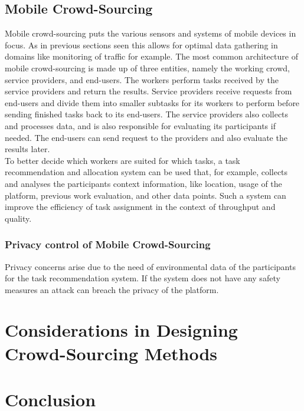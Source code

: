 \documentclass[a4paper,12pt]{report}
\begin{document}
	\section[Mobile Crowd-Sourcing]{Mobile Crowd-Sourcing \cite{MobileCrowdSourcing}}
	\startsection
		Mobile crowd-sourcing puts the various sensors and systems of mobile devices in focus. As in previous sections seen this allows for optimal data gathering in domains like monitoring of traffic for example.
		The most common architecture of mobile crowd-sourcing is made up of three entities, namely the working crowd, service providers, and end-users. The workers perform tasks received by the service providers and return the results. Service providers receive requests from end-users and divide them into smaller subtasks for its workers to perform before sending finished tasks back to its end-users. The service providers also collects and processes data, and is also responsible for evaluating its participants if needed. The end-users can send request to the providers and also evaluate the results later.\\
		To better decide which workers are suited for which tasks, a task recommendation and allocation system can be used that, for example, collects and analyses the participants context information, like location, usage of the platform, previous work evaluation, and other data points. Such a system can improve the efficiency of task assignment in the context of throughput and quality.
		\subsection{Privacy control of Mobile Crowd-Sourcing}
		\startsubsection
			Privacy concerns arise due to the need of environmental data of the participants for the task recommendation system. If the system does not have any safety measures an attack can breach the privacy  of the platform.
			\closesection  
	\closesection


	\chapter{Considerations in Designing Crowd-Sourcing Methods}
	\startsection
	\closesection
	
	\chapter{Conclusion}
	\startsection
	\closesection
	
	\newpage
	\printbibliography
\end{document}

